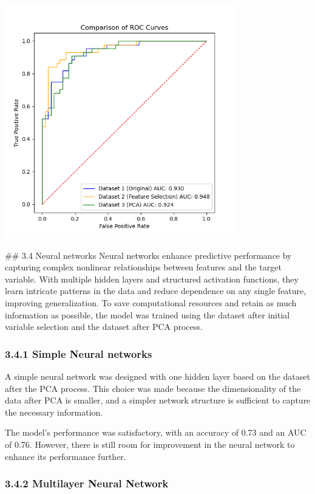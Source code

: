 \documentclass[
  12pt,
  letterpaper,
  DIV=11,
  numbers=noendperiod]{scrartcl}
\begin{document}
\begin{center}
\includegraphics[width=4in,height=4in]{svm.png}
\end{center}
\#\# 3.4 Neural networks Neural networks enhance predictive performance
by capturing complex nonlinear relationships between features and the
target variable. With multiple hidden layers and structured activation
functions, they learn intricate patterns in the data and reduce
dependence on any single feature, improving generalization. To save
computational resources and retain as much information as possible, the
model was trained using the dataset after initial variable selection and
the dataset after PCA process.

\subsubsection{3.4.1 Simple Neural
networks}\label{simple-neural-networks}

A simple neural network was designed with one hidden layer based on the
dataset after the PCA process. This choice was made because the
dimensionality of the data after PCA is smaller, and a simpler network
structure is sufficient to capture the necessary information.

The model's performance was satisfactory, with an accuracy of 0.73 and
an AUC of 0.76. However, there is still room for improvement in the
neural network to enhance its performance further.

\subsubsection{3.4.2 Multilayer Neural
Network}\label{multilayer-neural-network}
\end{document}
